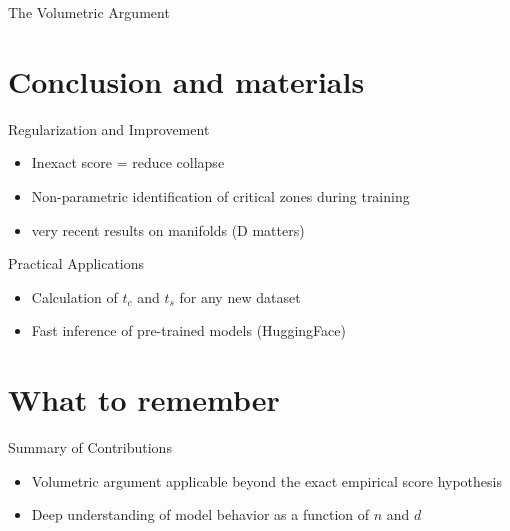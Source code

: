 \documentclass[aspectratio=169]{beamer}
\begin{document}
\begin{frame}{The Volumetric Argument}
    
    \begin{center}
    \end{center}
\end{frame}










\section{Conclusion and materials}
\begin{frame}{Regularization and Improvement}
    \begin{itemize}
        \item Inexact score  = reduce collapse
        \item Non-parametric identification of critical zones during training
        \item very recent results on manifolds (D matters)
    \end{itemize}
\end{frame}



\begin{frame}{Practical Applications}
    \begin{itemize}
        \item Calculation of $t_c$ and $t_s$ for any new dataset
        \item Fast inference of pre-trained models (HuggingFace)
    \end{itemize}
\end{frame}

\section{What to remember}
\begin{frame}{Summary of Contributions}
    \begin{itemize}
        \item Volumetric argument applicable beyond the exact empirical score hypothesis
        \item Deep understanding of model behavior as a function of $n$ and $d$
    \end{itemize}
\end{frame}
\end{document}
